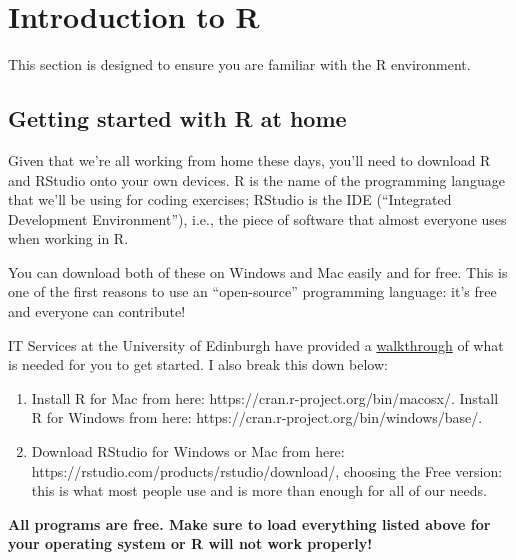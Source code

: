 \documentclass[
  letterpaper,
  DIV=11,
  numbers=noendperiod]{scrreprt}
\begin{document}
\hypertarget{introduction-to-r}{%
\chapter*{Introduction to R}\label{introduction-to-r}}

This section is designed to ensure you are familiar with the R
environment.

\hypertarget{getting-started-with-r-at-home}{%
\section*{Getting started with R at
home}\label{getting-started-with-r-at-home}}

Given that we're all working from home these days, you'll need to
download R and RStudio onto your own devices. R is the name of the
programming language that we'll be using for coding exercises; RStudio
is the IDE (``Integrated Development Environment''), i.e., the piece of
software that almost everyone uses when working in R.

You can download both of these on Windows and Mac easily and for free.
This is one of the first reasons to use an ``open-source'' programming
language: it's free and everyone can contribute!

IT Services at the University of Edinburgh have provided a
\href{https://uoe.sharepoint.com/sites/hss/sps/itservices/SPSShareSpaceManagement/Moblabdoc/SitePages/Computational-Text-Analysis.aspx?cid=59b29656-3df8-4c19-9423-24765076e742}{walkthrough}
of what is needed for you to get started. I also break this down below:

\begin{enumerate}
\def\labelenumi{\arabic{enumi}.}
\item
  Install R for Mac from here: https://cran.r-project.org/bin/macosx/.
  Install R for Windows from here:
  https://cran.r-project.org/bin/windows/base/.
\item
  Download RStudio for Windows or Mac from here:
  https://rstudio.com/products/rstudio/download/, choosing the Free
  version: this is what most people use and is more than enough for all
  of our needs.
\end{enumerate}

\textbf{All programs are free. Make sure to load everything listed above
for your operating system or R will not work properly!}
\end{document}
